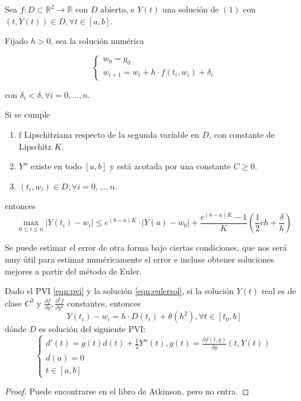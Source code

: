 \begin{theorem}
    Sea $f:D\subset \mathbb{R}^2\rightarrow \mathbb{R}$ con $D$ abierto, e $Y(t)$ una solución de $(1)$ con $(t,Y(t))\in D,\forall t\in[a,b]$.

    Fijado $h>0$, sea la solución numérica

\begin{equation}
\begin{cases}
    w_0=y_0 \\
    w_{i+1}=w_i + h\cdot f(t_i, w_i) + \delta_i
\end{cases}
\end{equation}

con $\delta_i<\delta,\forall i=0,\dots,n$.

    Si se cumple
    \begin{enumerate}[label=(\alph*)]
        \item f Lipschitziana respecto de la segunda variable en $D$, con constante de Lipschitz $K$.
        \item $Y''$ existe en todo $[a,b]$ y está acotada por una constante $C\geq 0$.
        \item $(t_i,w_i)\in D,\forall i=0,\dots,n$.
    \end{enumerate}
    entonces $$\max_{0\leq i \leq n}|Y(t_i)-w_i| \leq e^{(b-a)K}\cdot |Y(a)-w_0| + \frac{e^{(b-a)K}-1}{K}\left(\frac{1}{2}ch+\frac{\delta}{h}\right)$$

\end{theorem}

Se puede estimar el error de otra forma bajo ciertas condiciones, que nos será muy útil para estimar numéricamente el error e incluse obtener soluciones mejores a partir del método de Euler.

\begin{theorem}
    Dado el PVI \ref{eqn:pvi} y la solución \ref{eqn:eulersol}, si la solución $Y(t)$ real es de clase $C^3$ y $\frac{\partial f}{\partial y},\frac{\partial^2f}{\partial y^2}$ constantes, entonces
    \begin{equation}
    Y(t_i)-w_i=h\cdot D(t_i)+\theta(h^2),\forall t\in[t_0,b]
    \end{equation}
    dónde $D$ es solución del siguiente PVI:
\begin{equation}
\begin{cases}
    d'(t)=g(t)d(t) + \frac{1}{2} Y''(t), g(t)=\frac{\partial f(t,y)}{\partial y}(t,Y(t)) \\
    d(a) = 0 \\
    t\in[a,b]
\end{cases}
\end{equation}
\end{theorem}
\begin{proof}
Puede encontrarse en el libro de Atkinson, pero no entra.
\end{proof}

